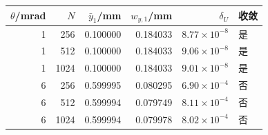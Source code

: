 \begin{tabular}{rrrrrl}\toprule
$\theta$/mrad & $N$ & $\bar y_1$/mm & $w_{y,1}$/mm & $\delta_U$ & 收敛\\\midrule
1 & 256 & 0.100000 & 0.184033 & \(8.77\times10^{-8}\) & 是\\
1 & 512 & 0.100000 & 0.184033 & \(9.06\times10^{-8}\) & 是\\
1 & 1024 & 0.100000 & 0.184033 & \(9.01\times10^{-8}\) & 是\\
6 & 256 & 0.599995 & 0.080295 & \(6.90\times10^{-4}\) & 否\\
6 & 512 & 0.599994 & 0.079749 & \(8.11\times10^{-4}\) & 否\\
6 & 1024 & 0.599994 & 0.079978 & \(8.02\times10^{-4}\) & 否\\
\bottomrule\end{tabular}